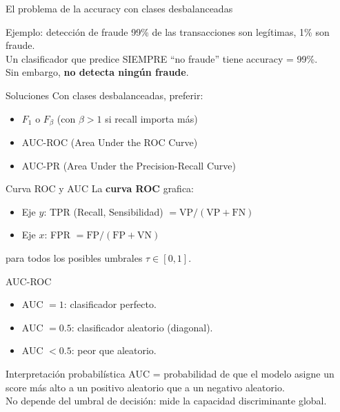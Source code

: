 \documentclass[aspectratio=169]{beamer}
\begin{document}
\begin{frame}{El problema de la accuracy con clases desbalanceadas}
  \begin{alertblock}{Ejemplo: detección de fraude}
    99\% de las transacciones son legítimas, 1\% son fraude.\\
    Un clasificador que predice SIEMPRE ``no fraude'' tiene accuracy = 99\%.\\
    Sin embargo, \textbf{no detecta ningún fraude}.
  \end{alertblock}

  \medskip
  \begin{block}{Soluciones}
    Con clases desbalanceadas, preferir:
    \begin{itemize}
      \item $F_1$ o $F_\beta$ (con $\beta > 1$ si recall importa más)
      \item AUC-ROC (Area Under the ROC Curve)
      \item AUC-PR (Area Under the Precision-Recall Curve)
    \end{itemize}
  \end{block}
\end{frame}

\begin{frame}{Curva ROC y AUC}
  La \textbf{curva ROC} grafica:
  \begin{itemize}
    \item Eje $y$: TPR (Recall, Sensibilidad) $= \text{VP}/(\text{VP}+\text{FN})$
    \item Eje $x$: FPR $= \text{FP}/(\text{FP}+\text{VN})$
  \end{itemize}
  para todos los posibles umbrales $\tau \in [0,1]$.

  \medskip
  \begin{block}{AUC-ROC}
    \begin{itemize}
      \item AUC $= 1$: clasificador perfecto.
      \item AUC $= 0.5$: clasificador aleatorio (diagonal).
      \item AUC $< 0.5$: peor que aleatorio.
    \end{itemize}
  \end{block}

  \medskip
  \begin{exampleblock}{Interpretación probabilística}
    AUC = probabilidad de que el modelo asigne un score más alto a un positivo aleatorio
    que a un negativo aleatorio.\\
    No depende del umbral de decisión: mide la capacidad discriminante global.
  \end{exampleblock}
\end{frame}
\end{document}
